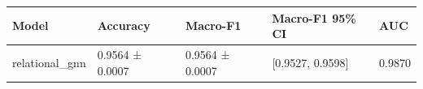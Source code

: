 \begin{tabular}{lllll}
\toprule
Model & Accuracy & Macro-F1 & Macro-F1 95\% CI & AUC \\
\midrule
relational\_gnn & 0.9564 ± 0.0007 & 0.9564 ± 0.0007 & [0.9527, 0.9598] & 0.9870 \\
\bottomrule
\end{tabular}
